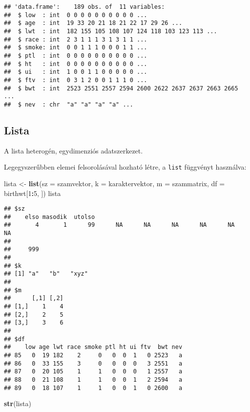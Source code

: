 \documentclass[]{book}
\newenvironment{Shaded}{\begin{snugshade}}{\end{snugshade}}
\newcommand{\DataTypeTok}[1]{\textcolor[rgb]{0.13,0.29,0.53}{#1}}
\newcommand{\DecValTok}[1]{\textcolor[rgb]{0.00,0.00,0.81}{#1}}
\newcommand{\KeywordTok}[1]{\textcolor[rgb]{0.13,0.29,0.53}{\textbf{#1}}}
\newcommand{\NormalTok}[1]{#1}
\newcommand{\OperatorTok}[1]{\textcolor[rgb]{0.81,0.36,0.00}{\textbf{#1}}}
\newcommand{\StringTok}[1]{\textcolor[rgb]{0.31,0.60,0.02}{#1}}
\begin{document}
\begin{verbatim}
## 'data.frame':    189 obs. of  11 variables:
##  $ low  : int  0 0 0 0 0 0 0 0 0 0 ...
##  $ age  : int  19 33 20 21 18 21 22 17 29 26 ...
##  $ lwt  : int  182 155 105 108 107 124 118 103 123 113 ...
##  $ race : int  2 3 1 1 1 3 1 3 1 1 ...
##  $ smoke: int  0 0 1 1 1 0 0 0 1 1 ...
##  $ ptl  : int  0 0 0 0 0 0 0 0 0 0 ...
##  $ ht   : int  0 0 0 0 0 0 0 0 0 0 ...
##  $ ui   : int  1 0 0 1 1 0 0 0 0 0 ...
##  $ ftv  : int  0 3 1 2 0 0 1 1 1 0 ...
##  $ bwt  : int  2523 2551 2557 2594 2600 2622 2637 2637 2663 2665 ...
##  $ nev  : chr  "a" "a" "a" "a" ...
\end{verbatim}

\hypertarget{lista}{%
\subsection{Lista}\label{lista}}

A lista heterogén, egydimenziós adatszerkezet.

Legegyszerűbben elemei felsorolásával hozható létre, a \texttt{list} függvényt használva:

\begin{Shaded}
\begin{Highlighting}[]
\NormalTok{lista <-}\StringTok{ }\KeywordTok{list}\NormalTok{(}\DataTypeTok{sz =}\NormalTok{ szamvektor, }\DataTypeTok{k =}\NormalTok{ karaktervektor, }\DataTypeTok{m =}\NormalTok{ szammatrix, }\DataTypeTok{df =}\NormalTok{ birthwt[}\DecValTok{1}\OperatorTok{:}\DecValTok{5}\NormalTok{, }
\NormalTok{    ])}
\NormalTok{lista}
\end{Highlighting}
\end{Shaded}

\begin{verbatim}
## $sz
##    elso masodik  utolso                                                 
##       4       1      99      NA      NA      NA      NA      NA      NA 
##         
##     999 
## 
## $k
## [1] "a"   "b"   "xyz"
## 
## $m
##      [,1] [,2]
## [1,]    1    4
## [2,]    2    5
## [3,]    3    6
## 
## $df
##    low age lwt race smoke ptl ht ui ftv  bwt nev
## 85   0  19 182    2     0   0  0  1   0 2523   a
## 86   0  33 155    3     0   0  0  0   3 2551   a
## 87   0  20 105    1     1   0  0  0   1 2557   a
## 88   0  21 108    1     1   0  0  1   2 2594   a
## 89   0  18 107    1     1   0  0  1   0 2600   a
\end{verbatim}

\begin{Shaded}
\begin{Highlighting}[]
\KeywordTok{str}\NormalTok{(lista)}
\end{Highlighting}
\end{Shaded}
\end{document}
